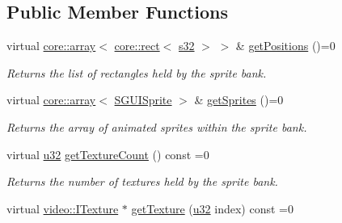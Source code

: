 \subsection*{Public Member Functions}
\begin{DoxyCompactItemize}
\item 
\mbox{\label{classirr_1_1gui_1_1IGUISpriteBank_ad32440617fd62d4d423c2814b2b4470e}} 
virtual \hyperlink{classirr_1_1core_1_1array}{core\+::array}$<$ \hyperlink{classirr_1_1core_1_1rect}{core\+::rect}$<$ \hyperlink{namespaceirr_ac66849b7a6ed16e30ebede579f9b47c6}{s32} $>$ $>$ \& \hyperlink{classirr_1_1gui_1_1IGUISpriteBank_ad32440617fd62d4d423c2814b2b4470e}{get\+Positions} ()=0
\begin{DoxyCompactList}\small\item\em Returns the list of rectangles held by the sprite bank. \end{DoxyCompactList}\item 
\mbox{\label{classirr_1_1gui_1_1IGUISpriteBank_a275b3d962407ea5b57bd2d526aae0be3}} 
virtual \hyperlink{classirr_1_1core_1_1array}{core\+::array}$<$ \hyperlink{structirr_1_1gui_1_1SGUISprite}{S\+G\+U\+I\+Sprite} $>$ \& \hyperlink{classirr_1_1gui_1_1IGUISpriteBank_a275b3d962407ea5b57bd2d526aae0be3}{get\+Sprites} ()=0
\begin{DoxyCompactList}\small\item\em Returns the array of animated sprites within the sprite bank. \end{DoxyCompactList}\item 
\mbox{\label{classirr_1_1gui_1_1IGUISpriteBank_aa3b81dd3d2bb43acb1ba2357f722196d}} 
virtual \hyperlink{namespaceirr_a0416a53257075833e7002efd0a18e804}{u32} \hyperlink{classirr_1_1gui_1_1IGUISpriteBank_aa3b81dd3d2bb43acb1ba2357f722196d}{get\+Texture\+Count} () const =0
\begin{DoxyCompactList}\small\item\em Returns the number of textures held by the sprite bank. \end{DoxyCompactList}\item 
\mbox{\label{classirr_1_1gui_1_1IGUISpriteBank_a8a8c324def2abd4e3e6d84aa7689d056}} 
virtual \hyperlink{classirr_1_1video_1_1ITexture}{video\+::\+I\+Texture} $\ast$ \hyperlink{classirr_1_1gui_1_1IGUISpriteBank_a8a8c324def2abd4e3e6d84aa7689d056}{get\+Texture} (\hyperlink{namespaceirr_a0416a53257075833e7002efd0a18e804}{u32} index) const =0

\end{DoxyCompactItemize}
